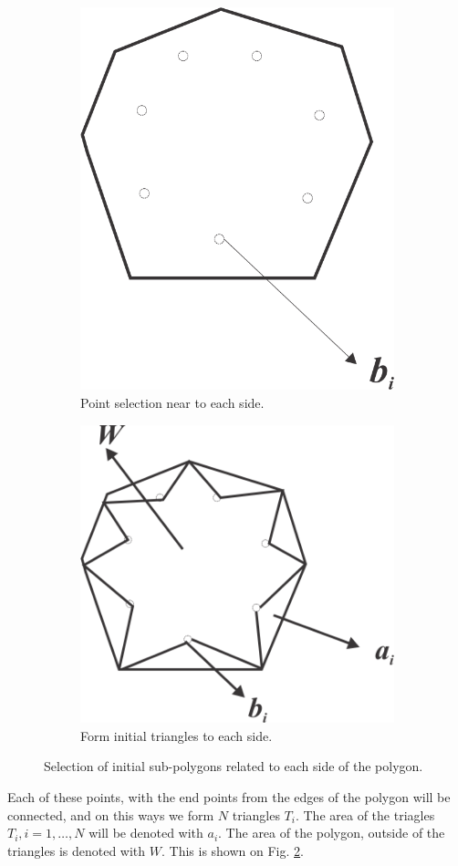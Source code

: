 \documentclass[11pt,leqno]{book}
\begin{document}
\begin{figure}
\centering
\begin{subfigure}{.5\textwidth}
  \centering
  \includegraphics[width=.5\linewidth]{pic04.png}
  \caption{Point selection near to each side.}
  \label{fig:sub5}
\end{subfigure}%
\begin{subfigure}{.5\textwidth}
  \centering
  \includegraphics[width=.6\linewidth]{pic05.png}
  \caption{Form initial triangles to each side.}
  \label{fig:sub6}
\end{subfigure}
\caption{Selection of initial sub-polygons related to each side of the polygon.}
\label{fig:three}
\end{figure}

Each of these points, with the end points from the edges of the polygon will be connected, and on this ways we form $N$ triangles  $T_i$. The area of the triagles $T_i, i=1, \ldots, N $ will be denoted with $a_i$. The area of the polygon, outside of the triangles is denoted with $W$.  This is shown on Fig. \ref{fig:sub6}.
\end{document}
